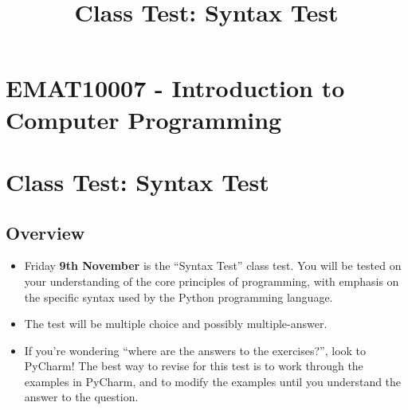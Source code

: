 \documentclass[11pt]{report}
\begin{document}
\title{Class Test: Syntax Test}
\section*{EMAT10007 - Introduction to Computer Programming}
\section*{Class Test: Syntax Test}
\subsection*{Overview}
\begin{itemize}
    \item Friday \textbf{9th November} is the ``Syntax Test'' class test. You will be tested on your understanding of the core principles of programming, with emphasis on the specific syntax used by the Python programming language.

	\item The test will be multiple choice and possibly multiple-answer.

    \item If you're wondering ``where are the answers to the exercises?'', look to PyCharm! The best way to revise for this test is to work through the examples in PyCharm, and to modify the examples until you understand the answer to the question.


\end{itemize}
\end{document}
